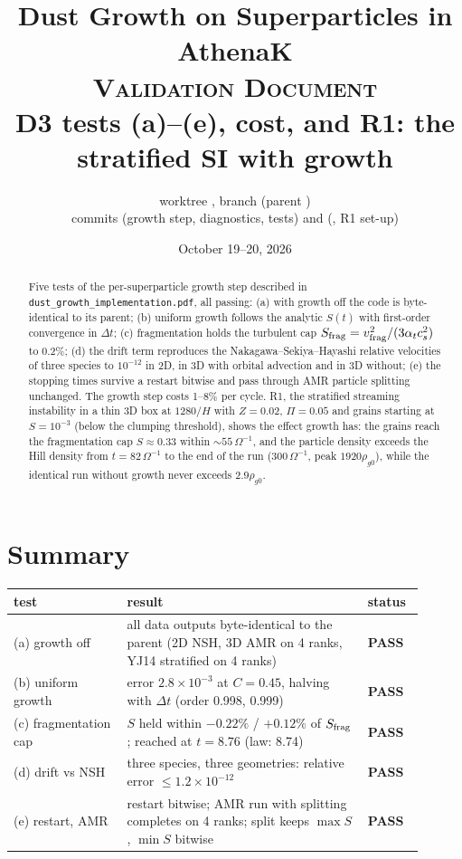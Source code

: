 \documentclass[11pt]{article}
\title{Dust Growth on Superparticles in AthenaK\\[0.4em]
       \large \textsc{Validation Document}\\
       \large D3 tests (a)--(e), cost, and R1: the stratified SI with growth}
\author{worktree \code{athenak-worktrees/dust-growth}, branch \code{dust-growth}
        (parent \code{9aaa5639})\\
        \small commits \code{a821cb4d} (growth step, diagnostics, tests) and
        \code{e231fc7f} (\code{nsh\_init}, R1 set-up)}
\date{October 19--20, 2026}
\newcommand{\file}[1]{\texttt{\small #1}}
\newcommand{\St}{S}
\newcommand{\vf}{v_{\rm frag}}
\newcommand{\pass}{\textcolor{green!45!black}{\textbf{PASS}}}
\begin{document}
\maketitle

\begin{abstract}
\noindent
Five tests of the per-superparticle growth step described in
\file{dust\_growth\_implementation.pdf}, all passing: (a) with growth off the code is
byte-identical to its parent; (b) uniform growth follows the analytic $\St(t)$ with
first-order convergence in $\Delta t$; (c) fragmentation holds the turbulent cap
$\St_{\rm frag}=\vf^2/(3\alpha_t c_s^2)$ to 0.2\%; (d) the drift term reproduces the
Nakagawa--Sekiya--Hayashi relative velocities of three species to $10^{-12}$ in 2D,
in 3D with orbital advection and in 3D without; (e) the stopping times survive a
restart bitwise and pass through AMR particle splitting unchanged. The growth step
costs 1--8\% per cycle. R1, the stratified streaming instability in a thin 3D box at
$1280/H$ with $Z=0.02$, $\Pi=0.05$ and grains starting at $\St=10^{-3}$ (below the
clumping threshold), shows the effect growth has: the grains reach the fragmentation
cap $\St\approx0.33$ within $\sim\!55\,\Omega^{-1}$, and the particle density exceeds
the Hill density from $t=82\,\Omega^{-1}$ to the end of the run ($300\,\Omega^{-1}$,
peak $1920\rho_{g0}$), while the identical run without growth never exceeds
$2.9\rho_{g0}$.
\end{abstract}

\tableofcontents

\section{Summary}

\begin{longtable}{>{\raggedright\arraybackslash}p{0.25\linewidth}>{\raggedright\arraybackslash}p{0.53\linewidth}p{0.12\linewidth}}
\toprule
test & result & status \\
\midrule
{}(a) growth off & all data outputs byte-identical to the parent (2D NSH, 3D AMR on 4
  ranks, YJ14 stratified on 4 ranks) & \pass \\
{}(b) uniform growth & error $2.8\times10^{-3}$ at $C=0.45$, halving with $\Delta t$
  (order 0.998, 0.999) & \pass \\
{}(c) fragmentation cap & $\St$ held within $-0.22\%$ / $+0.12\%$ of $\St_{\rm frag}$;
  reached at $t=8.76$ (law: 8.74) & \pass \\
{}(d) drift vs NSH & three species, three geometries: relative error $\le1.2\times10^{-12}$
  & \pass \\
{}(e) restart, AMR & restart bitwise; AMR run with splitting completes on 4 ranks;
  split keeps $\max\St$, $\min\St$ bitwise & \pass \\
\bottomrule
\end{longtable}
\end{document}
